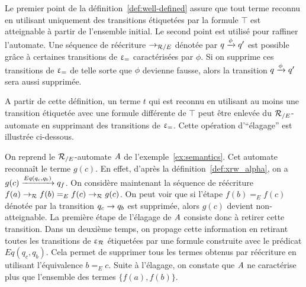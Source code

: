 \noindent
Le premier point de la définition~\ref{def:well-defined} assure que
tout terme reconnu en utilisant uniquement des transitions étiquetées
par la formule $\top$ est atteignable à partir de l'ensemble initial.
Le second point est utilisé pour raffiner l'automate. Une séquence de réécriture
$\rightarrow_{\mathcal R/E}$ dénotée par $q \xrightarrow{\phi} q'$ est possible grâce à certaines transitions
de $\upvarepsilon_{=}$ caractérisées par $\phi$. Si on supprime ces transitions de $\upvarepsilon_{=}$ de telle sorte
que $\phi$ devienne fausse, alors la transition $q \xrightarrow{\phi} q'$ sera aussi supprimée.

A partir de cette définition, un terme $t$ qui est reconnu en 
utilisant au moins une transition étiquetée avec une formule différente de $\top$
peut être enlevée du ${\mathcal R_{/E}}$-automate en supprimant des transitions de $\upvarepsilon_{=}$.
Cette opération d'``élagage''  est illustrée ci-dessous.

\begin{example}
  \label{ex:pruning}
  On reprend le ${\mathcal R_{/E}}$-automate $\mathit A$ de l'exemple~\ref{ex:semantics}.
  Cet automate reconnaît le terme $g(c)$. En effet, d'après la
  définition~\ref{def:xrw_alpha}, on a $g(c) \xrightarrow{Eq(q_c, q_b)}
  q_f$. On considère maintenant la séquence de réécriture $f(a) \rightarrow_\mathcal R f(b) =_E f(c) 
  \rightarrow_\mathcal R g(c)$. On peut voir que si l'étape $f(b) =_E f(c)$ dénotée par la 
  transition $q_c \rightarrow q_b$ est supprimée, alors $g(c)$ devient non-atteignable. 
  La première étape de l'élagage de $\mathit A$ consiste donc à retirer cette
  transition. Dans un deuxième temps, on propage cette information en retirant
  toutes les transitions de $\upvarepsilon_{\mathcal R}$ étiquetées par une formule construite avec le prédicat $Eq(q_c, q_b)$.
  Cela permet de supprimer tous les termes obtenus par réécriture en utilisant l'équivalence $b =_E c$.
  Suite à l'élagage, on constate que $\mathit A$ ne caractérise plus que l'ensemble des termes $\{f(a), f(b)\}$.
\end{example}





